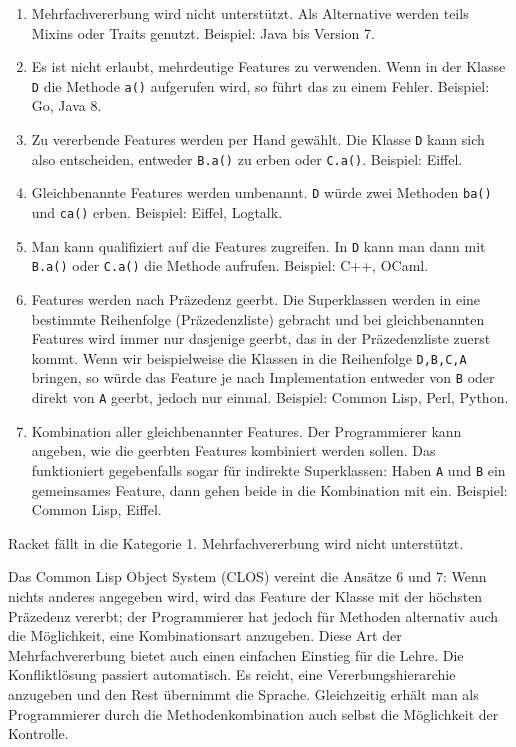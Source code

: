 \begin{enumerate}
 \item Mehrfachvererbung wird nicht unterstützt. Als Alternative werden teils Mixins oder Traits genutzt. Beispiel: Java bis Version 7.
 \item Es ist nicht erlaubt, mehrdeutige Features zu verwenden. Wenn in der Klasse \texttt{D} die Methode \texttt{a()} aufgerufen wird, so führt das zu einem Fehler. Beispiel: Go, Java 8.
 \item Zu vererbende Features werden per Hand gewählt. Die Klasse \texttt{D} kann sich also entscheiden, entweder \texttt{B.a()} zu erben oder \texttt{C.a()}. Beispiel: Eiffel.
 \item Gleichbenannte Features werden umbenannt. \texttt{D} würde zwei Methoden \texttt{ba()} und \texttt{ca()} erben. Beispiel: Eiffel, Logtalk.
 \item Man kann qualifiziert auf die Features zugreifen. In \texttt{D} kann man dann mit \texttt{B.a()} oder \texttt{C.a()} die Methode aufrufen. Beispiel: C++, OCaml.
 \item Features werden nach Präzedenz geerbt. Die Superklassen werden in eine bestimmte Reihenfolge (Präzedenzliste) gebracht und bei gleichbenannten Features wird immer nur dasjenige geerbt, das in der Präzedenzliste zuerst kommt. Wenn wir beispielweise die Klassen in die Reihenfolge \texttt{D,B,C,A} bringen, so würde das Feature je nach Implementation entweder von \texttt{B} oder direkt von \texttt{A} geerbt, jedoch nur einmal. Beispiel: Common Lisp, Perl, Python.
 \item Kombination aller gleichbenannter Features. Der Programmierer kann angeben, wie die geerbten Features kombiniert werden sollen. Das funktioniert gegebenfalls sogar für indirekte Superklassen: Haben \texttt{A} und \texttt{B} ein gemeinsames Feature, dann gehen beide in die Kombination mit ein. Beispiel: Common Lisp, Eiffel.
\end{enumerate}


Racket fällt in die Kategorie 1. Mehrfachvererbung wird nicht unterstützt.

Das Common Lisp Object System (CLOS) vereint die Ansätze 6 und 7: Wenn nichts anderes angegeben wird, wird das Feature der Klasse mit der höchsten Präzedenz vererbt; der Programmierer hat jedoch für Methoden alternativ auch die Möglichkeit, eine Kombinationsart anzugeben. Diese Art der Mehrfachvererbung bietet auch einen einfachen Einstieg für die Lehre. Die Konfliktlösung passiert automatisch. Es reicht, eine Vererbungshierarchie anzugeben und den Rest übernimmt die Sprache. Gleichzeitig erhält man als Programmierer durch die Methodenkombination auch selbst die Möglichkeit der Kontrolle.

